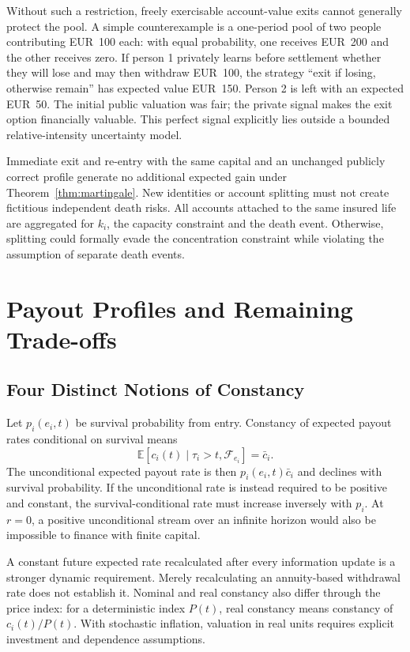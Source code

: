 \documentclass[11pt,a4paper]{article}
\theoremstyle{definition}\newtheorem{definition}[theorem]{Definition}
\theoremstyle{remark}\newtheorem{remark}[theorem]{Remark}
\newcommand{\E}{\mathbb E}
\newcommand{\calF}{\mathcal F}
\begin{document}
Without such a restriction, freely exercisable account-value exits cannot generally protect the pool. A simple counterexample is a one-period pool of two people contributing EUR~100 each: with equal probability, one receives EUR~200 and the other receives zero. If person 1 privately learns before settlement whether they will lose and may then withdraw EUR~100, the strategy ``exit if losing, otherwise remain'' has expected value EUR~150. Person 2 is left with an expected EUR~50. The initial public valuation was fair; the private signal makes the exit option financially valuable. This perfect signal explicitly lies outside a bounded relative-intensity uncertainty model.

Immediate exit and re-entry with the same capital and an unchanged publicly correct profile generate no additional expected gain under Theorem~\ref{thm:martingale}. New identities or account splitting must not create fictitious independent death risks. All accounts attached to the same insured life are aggregated for $k_i$, the capacity constraint and the death event. Otherwise, splitting could formally evade the concentration constraint while violating the assumption of separate death events.

\section{Payout Profiles and Remaining Trade-offs}\label{sec:income}
\subsection{Four Distinct Notions of Constancy}
Let $p_i(e_i,t)$ be survival probability from entry. Constancy of expected payout rates conditional on survival means
\[
\E[c_i(t)\mid\tau_i>t,\calF_{e_i}]=\bar c_i.
\]
The unconditional expected payout rate is then $p_i(e_i,t)\bar c_i$ and declines with survival probability. If the unconditional rate is instead required to be positive and constant, the survival-conditional rate must increase inversely with $p_i$. At $r=0$, a positive unconditional stream over an infinite horizon would also be impossible to finance with finite capital.

A constant future expected rate recalculated after every information update is a stronger dynamic requirement. Merely recalculating an annuity-based withdrawal rate does not establish it. Nominal and real constancy also differ through the price index: for a deterministic index $P(t)$, real constancy means constancy of $c_i(t)/P(t)$. With stochastic inflation, valuation in real units requires explicit investment and dependence assumptions.
\end{document}
